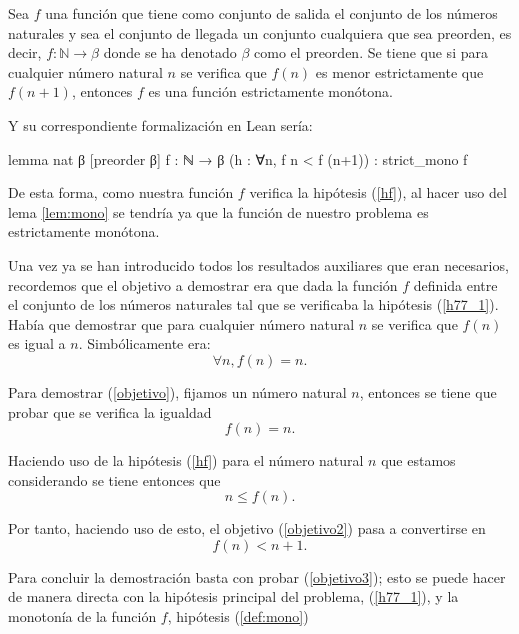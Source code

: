 \begin{demostracion}
  \begin{lema}\label{lem:mono}
    Sea \(f\) una función que tiene como conjunto de salida el conjunto
    de los números naturales y sea el conjunto de llegada un conjunto
    cualquiera que sea preorden, es decir, \(f:ℕ → β\) donde se ha
    denotado \(β\) como el preorden. Se tiene que si para cualquier
    número natural \(n\) se verifica que \(f(n)\) es menor estrictamente
    que \(f(n+1)\), entonces \(f\) es una función estrictamente
    monótona.
  \end{lema}

  Y su correspondiente formalización en Lean sería:
  \begin{leancode}
    lemma nat {β} [preorder β] {f : ℕ → β} (h : ∀n, f n < f (n+1)) :
    strict_mono f
  \end{leancode}

  De esta forma, como nuestra función \(f\) verifica la hipótesis
  (\ref{hf}), al hacer uso del lema \ref{lem:mono} se tendría ya que la
  función de nuestro problema es estrictamente monótona.

  Una vez ya se han introducido todos los resultados auxiliares que eran
  necesarios, recordemos que el objetivo a demostrar era que dada la
  función \(f\) definida entre el conjunto de los números naturales tal
  que se verificaba la hipótesis (\ref{h77_1}). Había que demostrar que
  para cualquier número natural \(n\) se verifica que \(f(n)\) es igual
  a \(n\). Simbólicamente era:
  \begin{equation}\label{objetivo}
    ∀n, f(n) = n.
  \end{equation}

  Para demostrar (\ref{objetivo}), fijamos un número natural \(n\),
  entonces se tiene que probar que se verifica la igualdad
  \begin{equation}\label{objetivo2}
    f(n) = n.
  \end{equation}

  Haciendo uso de la hipótesis (\ref{hf}) para el número natural \(n\)
  que estamos considerando se tiene entonces que
  \begin{equation}
    n ≤ f(n).
  \end{equation}

  Por tanto, haciendo uso de esto, el objetivo (\ref{objetivo2}) pasa a
  convertirse en
  \begin{equation}\label{objetivo3}
    f(n) < n+1.
  \end{equation}

  Para concluir la demostración basta con probar (\ref{objetivo3}); esto
  se puede hacer de manera directa con la hipótesis principal del
  problema, (\ref{h77_1}), y la monotonía de la función \(f\), hipótesis
  (\ref{def:mono})
\end{demostracion}

